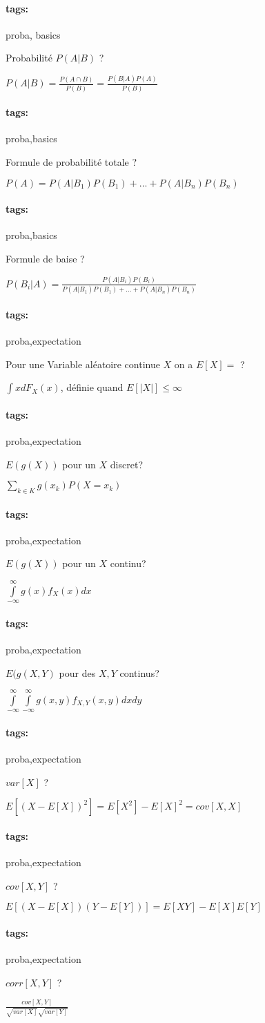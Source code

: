 \documentclass[12pt]{article}
\newcommand*{\xfield}[1]{\begin{mdframed}\centering #1\end{mdframed}\bigskip}
\newenvironment{note}{}{}
\newcommand*{\tags}[1]{\paragraph{tags: }#1}
\begin{document}
\begin{note}
	\tags{proba, basics}
	\xfield{Probabilité $P(A | B)$ ?}
	\xfield{$P(A | B) = \frac{P(A \cap B)}{P(B)} = \frac{P(B | A)P(A)}{P(B)}$}
\end{note}

\begin{note}
	\tags{proba,basics}
	\xfield{Formule de probabilité totale ?}
	\xfield{$P(A) = P(A | B_1)P(B_1)+...+P(A | B_n)P(B_n)$}
\end{note}

\begin{note}
	\tags{proba,basics}
	\xfield{Formule de baise ?}
	\xfield{$P(B_i | A) = \frac{P(A | B_i)P(B_i)}{P(A | B_1)P(B_1) + ... + P(A | B_n)P(B_n)}$}
\end{note}

\begin{note}
	\tags{proba,expectation}
	\xfield{Pour une Variable aléatoire continue $X$ on a $E[X] =$ ?}
	\xfield{$\int xdF_X(x)$, définie quand $E[|X|] \leq \infty $}
\end{note}

\begin{note}
	\tags{proba,expectation}
	\xfield{$E(g(X))$ pour un $X$ discret?}
	\xfield{$\sum \limits_{k \in K} g(x_k)P(X = x_k)$}
\end{note}

\begin{note}
	\tags{proba,expectation}
	\xfield{$E(g(X))$ pour un $X$ continu?}
	\xfield{$\int \limits_{-\infty}^{\infty} g(x)f_X(x)dx$}
\end{note}

\begin{note}
	\tags{proba,expectation}
	\xfield{$E(g(X,Y)$ pour des $X,Y$ continus?}
	\xfield{$\int \limits_{-\infty}^{\infty} \int \limits_{-\infty}^{\infty} g(x,y)f_{X,Y}(x,y)dxdy$}
\end{note}

\begin{note}
	\tags{proba,expectation}
	\xfield{$var[X]$ ?}
	\xfield{$E[(X-E[X])^2] = E[X^2]-E[X]^2 = cov[X,X]$}
\end{note}

\begin{note}
	\tags{proba,expectation}
	\xfield{$cov[X,Y]$ ?}
	\xfield{$E[(X-E[X])(Y-E[Y])] = E[XY] - E[X]E[Y]$}
\end{note}

\begin{note}
	\tags{proba,expectation}
	\xfield{$corr[X,Y]$ ?}
	\xfield{$\frac{cov[X,Y]}{
	\sqrt{var[X]}
	\sqrt{var[Y]}}$}
\end{note}
\end{document}
